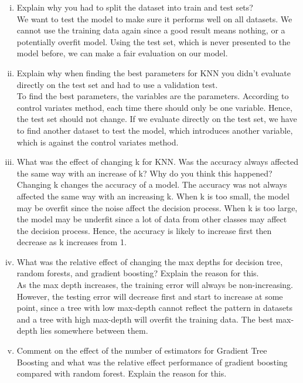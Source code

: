 \documentclass[12pt]{article}
\begin{document}
\begin{enumerate}[i)]
  \item Explain why you had to split the dataset into train and test sets? \\
  We want to test the model to make sure it performs well on all datasets. We cannot use the training data again since a good result means nothing, or a potentially overfit model. Using the test set, which is never presented to the model before, we can make a fair evaluation on our model. 
  \item Explain why when finding the best parameters for KNN you didn’t evaluate directly on the test set and had to use a validation test.\\
  To find the best parameters, the variables are the parameters. According to control variates method, each time there should only be one variable. Hence, the test set should not change. If we evaluate directly on the test set, we have to find another dataset to test the model, which introduces another variable, which is against the control variates method.
  \item What was the effect of changing k for KNN. Was the accuracy always affected the same way with an increase of k? Why do you think this happened?\\
  Changing k changes the accuracy of a model. The accuracy was not always affected the same way with an increasing k. When k is too small, the model may be overfit since the noise affect the decision process. When k is too large, the model may be underfit since a lot of data from other classes may affect the decision process. Hence, the accuracy is likely to increase first then decrease as k increases from 1.
  \item What was the relative effect of changing the max depths for decision tree, random forests, and gradient boosting? Explain the reason for this.\\
  As the max depth increases, the training error will always be non-increasing. However, the testing error will decrease first and start to increase at some point, since a tree with low max-depth cannot reflect the pattern in datasets and a tree with high max-depth will overfit the training data. The best max-depth lies somewhere between them.
  \item Comment on the effect of the number of estimators for Gradient Tree Boosting and what was the relative effect performance of gradient boosting compared with random forest. Explain the reason for this.\\

\end{enumerate}
\end{document}
